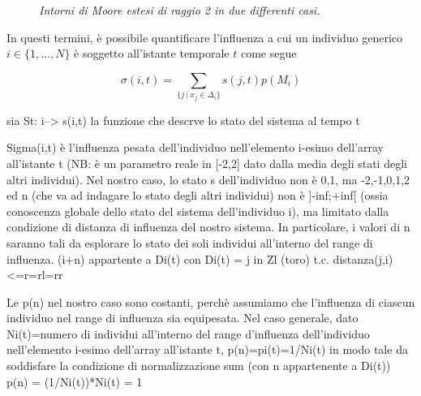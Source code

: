 \documentclass{article}
\begin{document}
\begin{figure}[h]
\centering
{}
\caption{\textit{Intorni di Moore estesi di raggio 2 in due differenti casi.}}
\label{fig:3}
\end{figure}

In questi termini, è possibile quantificare l'influenza a cui un individuo generico $\textit{i} \in \{1,...,\textit{N} \}$ è soggetto all'istante temporale $\textit{t}$ come segue

\begin{equation}
    \sigma(i,t) = \sum_{ \{ j \ | \ x_{j} \in \Delta_{i} \} } s(j, t)p(M_{i})
    \label{Eq:1}
\end{equation}

sia St: i--> s(i,t) la funzione che descrve lo stato del sistema al tempo t

Sigma(i,t) è l'influenza pesata dell'individuo nell'elemento i-esimo dell'array all'istante t (NB: è un parametro reale in [-2,2] dato dalla media degli stati degli altri individui).
Nel nostro caso, lo stato s dell'individuo non è {0,1}, ma {-2,-1,0,1,2} ed n (che va ad indagare lo stato degli altri individui) non è ]-inf;+inf[ (ossia conoscenza globale dello stato del sistema dell'individuo i), ma limitato dalla condizione di distanza di influenza del nostro sistema.
In particolare, i valori di n saranno tali da esplorare lo stato dei soli individui all'interno del range di influenza.
(i+n) appartente a Di(t)
con Di(t) = {j in Zl (toro) t.c. distanza(j,i)<=r=rl=rr} %

Le p(n) nel nostro caso sono costanti, perchè assumiamo che l'influenza di ciascun individuo nel range di influenza sia equipesata.
Nel caso generale, dato Ni(t)=numero di individui all'interno del range d'influenza dell'individuo nell'elemento i-esimo dell'array all'istante t,
p(n)=pi(t)=1/Ni(t)
in modo tale da soddisfare la condizione di normalizzazione
sum (con n appartenente a Di(t)) p(n) = (1/Ni(t))*Ni(t) = 1
\end{document}
